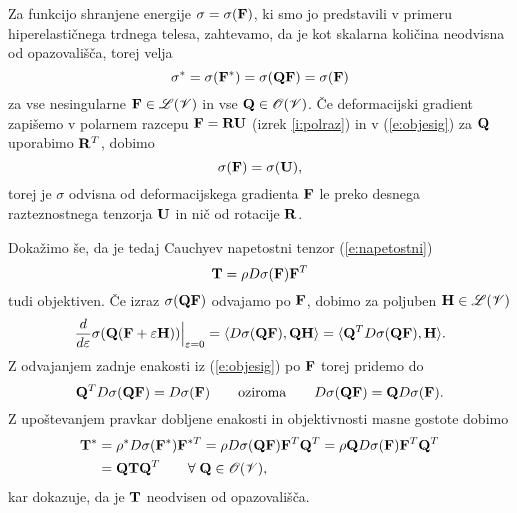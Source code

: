 Za funkcijo shranjene energije $\sigma=\sigma(\mathbf F)$, ki smo jo predstavili v primeru
hiperelastičnega trdnega telesa, zahtevamo, da je kot skalarna količina neodvisna
od opazovališča, torej velja
\begin{equation} \label{e:objesig}
	\sigma^*=\sigma(\mathbf F^*)=\sigma(\mathbf Q\mathbf F)=\sigma(\mathbf F)
\end{equation}
za vse nesingularne $\mathbf F\in\mathscr L(\mathscr V)$ in vse $\mathbf Q\in\mathscr{O}(\mathscr V)$.
Če deformacijski gradient zapišemo v polarnem razcepu $\mathbf F=\mathbf R\mathbf U$ (izrek \ref{i:polraz})
in v (\ref{e:objesig}) za $\mathbf Q$ uporabimo $\mathbf R^T$, dobimo
\begin{equation} \label{e:siuonly}
	\sigma(\mathbf F)=\sigma(\mathbf U),
\end{equation}
torej je $\sigma$ odvisna od deformacijskega gradienta $\mathbf F$ le preko desnega
razteznostnega tenzorja $\mathbf U$ in nič od rotacije $\mathbf R$.

Dokažimo še, da je tedaj Cauchyev napetostni tenzor (\ref{e:napetostni})
\begin{equation} \label{e:Tdrugi}
	\mathbf T=\rho D\sigma(\mathbf F)\mathbf F^T
\end{equation}
tudi objektiven. Če izraz $\sigma(\mathbf Q\mathbf F)$ odvajamo po $\mathbf F$,
dobimo za poljuben $\mathbf H\in\mathscr L(\mathscr V)$
\[
	\frac{d}{d\varepsilon}\sigma(\mathbf Q(\mathbf F+\varepsilon\mathbf H))\Big|_{\varepsilon=0}
	=\langle D\sigma(\mathbf Q\mathbf F),\mathbf Q\mathbf H\rangle=\langle\mathbf Q^T D\sigma(\mathbf Q\mathbf F),\mathbf H\rangle.
\]
Z odvajanjem zadnje enakosti iz (\ref{e:objesig}) po $\mathbf F$ torej pridemo do
\[
	\mathbf Q^T D\sigma(\mathbf Q\mathbf F) = D\sigma(\mathbf F)\qquad\textrm{oziroma}
	\qquad D\sigma(\mathbf Q\mathbf F) = \mathbf QD\sigma(\mathbf F).
\]
Z upoštevanjem pravkar dobljene enakosti in objektivnosti masne gostote dobimo
\begin{align*}
	\mathbf T^*&=\rho^* D\sigma(\mathbf F^*)\mathbf F^{*T}
	=\rho D\sigma(\mathbf Q\mathbf F)\mathbf F^{T}\mathbf Q^{T}
	=\rho \mathbf Q D\sigma(\mathbf F)\mathbf F^{T}\mathbf Q^{T} \nonumber \\
	&=\mathbf Q\mathbf T\mathbf Q^{T}\qquad\forall\;\mathbf Q\in\mathscr{O}(\mathscr V),
\end{align*}
kar dokazuje, da je $\mathbf T$ neodvisen od opazovališča.


